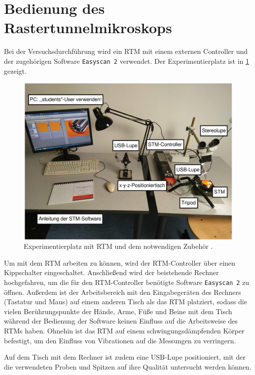 \section{Bedienung des Rastertunnelmikroskops}\label{sec:versuch}

Bei der Versuchsdurchführung wird ein RTM mit einem externen Controller und der zugehörigen Software \texttt{Easyscan 2} verwendet.
Der Experimentierplatz ist in \cref{fig:versuchsplatz} gezeigt.
\begin{figure}[H]
	\centering
	\includegraphics[width=0.8\linewidth]{../figs/versuchsplatz.png}
	\caption{Experimentierplatz mit RTM und dem notwendigen Zubehör \cite{skript}.}
	\label{fig:versuchsplatz}
\end{figure}
Um mit dem RTM arbeiten zu können, wird der RTM-Controller über einen Kippschalter eingeschaltet. Anschließend wird der beistehende Rechner
hochgefahren, um die für den RTM-Controller benötigte Software \texttt{Easyscan 2} zu öffnen. Außerdem ist der Arbeitsbereich mit den Eingabegeräten
des Rechners (Tastatur und Maus) auf einem anderen Tisch als das RTM platziert, sodass die vielen Berührungspunkte der Hände, Arme, Füße und Beine mit dem Tisch während der Bedienung
der Software keinen Einfluss auf die Arbeitsweise des RTMs haben. Ohnehin ist das RTM auf einem schwingungsdämpfenden Körper befestigt, um
den Einfluss von Vibrationen auf die Messungen zu verringern. %
\par
Auf dem Tisch mit dem Rechner ist zudem eine USB-Lupe positioniert, mit der die verwendeten Proben und Spitzen auf ihre Qualität untersucht werden können.
